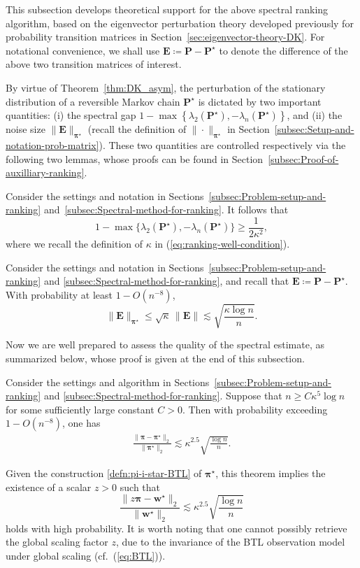 This subsection develops theoretical support for the above spectral ranking algorithm,
based on the eigenvector perturbation theory developed previously for probability transition matrices in Section~\ref{sec:eigenvector-theory-DK}.
For notational convenience, we shall use $\bm{E}\coloneqq\bm{P}-\bm{P}^{\star}$ to
denote the difference of the above two transition matrices of interest.


By virtue of Theorem~\ref{thm:DK_asym},
the perturbation of the stationary distribution of a reversible Markov
chain $\bm{P}^{\star}$ is dictated by two important quantities: (i)
the spectral gap $1-\max\left\{ \lambda_{2}(\bm{P}^{\star}),-\lambda_{n}(\bm{P}^{\star})\right\} $,
and (ii) the noise size $\|\bm{E}\|_{\bm{\pi}^{\star}}$ (recall the definition of $\|\cdot\|_{\bm{\pi}^{\star}}$  in Section~\ref{subsec:Setup-and-notation-prob-matrix}).
These two quantities are controlled respectively via the following two lemmas, whose
proofs can be found in Section~\ref{subsec:Proof-of-auxilliary-ranking}.

\begin{lemma}
	\label{lemma:ranking-gap}
	Consider the settings and notation in Sections~\ref{subsec:Problem-setup-and-ranking} and~\ref{subsec:Spectral-method-for-ranking}. It follows that
%
\[
1-\max\big\{ \lambda_{2}(\bm{P}^{\star}),-\lambda_{n}(\bm{P}^{\star}) \big\} \geq\frac{1}{2\kappa^{2}},
\]
%
where we recall the definition of $\kappa$  in (\ref{eq:ranking-well-condition}).
\end{lemma}
%
\begin{lemma}
	\label{lemma:ranking-noise}
Consider the settings and notation in
Sections~\ref{subsec:Problem-setup-and-ranking} and \ref{subsec:Spectral-method-for-ranking}, and recall that $\bm{E}\coloneqq\bm{P}-\bm{P}^{\star}$.
With probability at least $1-O(n^{-8})$,
%
\[
	\|\bm{E}\|_{\bm{\pi}^{\star}}\leq \sqrt{\kappa}\,\|\bm{E}\| \lesssim\sqrt{\frac{\kappa\log n}{n}}.
\]
%
\end{lemma}
%
Now we are well prepared to assess the quality of the spectral estimate, as summarized below, whose proof is given at the end of this subsection.
%
\begin{theorem}
\label{thm:ranking}
Consider the settings and algorithm in Sections~\ref{subsec:Problem-setup-and-ranking}
and \ref{subsec:Spectral-method-for-ranking}. Suppose that $n\geq C\kappa^{5}\log n$
for some sufficiently large constant $C>0$. Then with probability
exceeding $1-O(n^{-8})$, one has
%
\begin{align}
	\frac{\|\bm{\pi}-\bm{\pi}^{\star}\|_{2}}{\|\bm{\pi}^{\star}\|_{2}}\lesssim\kappa^{2.5}\sqrt{\frac{\log n}{n}}.
	\label{eq:pi-pistar-quality-ranking}
\end{align}
%
\end{theorem}
%
Given the construction \eqref{defn:pi-i-star-BTL} of $\bm{\pi}^{\star}$, this theorem implies the existence of a scalar $z>0$ such that
%
\[
	\frac{\| z\bm{\pi} - \bm{w}^{\star}\|_{2}}{\|\bm{w}^{\star}\|_{2}}\lesssim\kappa^{2.5}\sqrt{\frac{\log n}{n}}
\]
%
holds with high probability. It is worth noting that one cannot possibly retrieve the global scaling factor $z$, due to the invariance of the BTL observation model under global scaling (cf.~(\ref{eq:BTL})).



